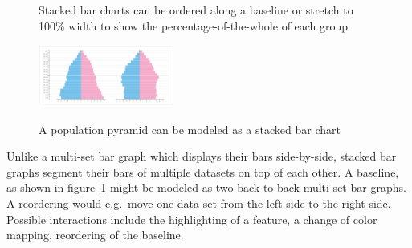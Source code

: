 \documentclass{article}
\begin{document}
\begin{figure}
  \centering
    \qquad
    \caption{Stacked bar charts can be ordered along a baseline or stretch to 100\% width to show the percentage-of-the-whole of each group}%
    \label{fig:concept:chart-types:stacked-bar-chart}
\end{figure}
\begin{figure}
  \centering
    \includegraphics[width=0.4\textwidth]{images/chartTypes/population-pyramid.png}%
    \label{fig:concept:chart-types:population-pyramid}
    \caption{A population pyramid can be modeled as a stacked bar chart}%
\end{figure}

Unlike a multi-set bar graph which displays their bars side-by-side, stacked bar graphs segment their bars of multiple datasets on top of each other.
A baseline, as shown in figure~\ref{fig:concept:chart-types:stacked-bar-chart} might be modeled as two back-to-back multi-set bar graphs. A reordering would e.g.\ move one data set from the left side to the right side.
Possible interactions include the highlighting of a feature, a change of color mapping, reordering of the baseline.
\end{document}
